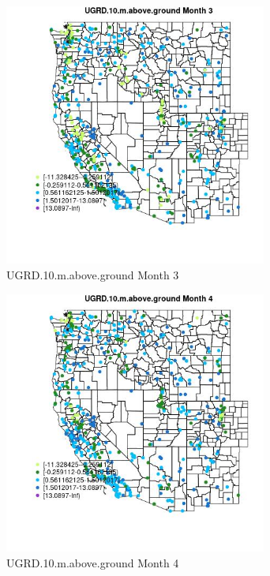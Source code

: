 \begin{figure} 
\centering  
\includegraphics[width=0.77\textwidth]{Code_Outputs/Report_ML_input_PM25_Step4_part_e_de_duplicated_aves_compiled_2019-05-14wNAs_MapObsMo3UGRD10maboveground.jpg} 
\caption{\label{fig:Report_ML_input_PM25_Step4_part_e_de_duplicated_aves_compiled_2019-05-14wNAsMapObsMo3UGRD10maboveground}UGRD.10.m.above.ground Month 3} 
\end{figure} 
 

\clearpage 

\begin{figure} 
\centering  
\includegraphics[width=0.77\textwidth]{Code_Outputs/Report_ML_input_PM25_Step4_part_e_de_duplicated_aves_compiled_2019-05-14wNAs_MapObsMo4UGRD10maboveground.jpg} 
\caption{\label{fig:Report_ML_input_PM25_Step4_part_e_de_duplicated_aves_compiled_2019-05-14wNAsMapObsMo4UGRD10maboveground}UGRD.10.m.above.ground Month 4} 
\end{figure} 
 

